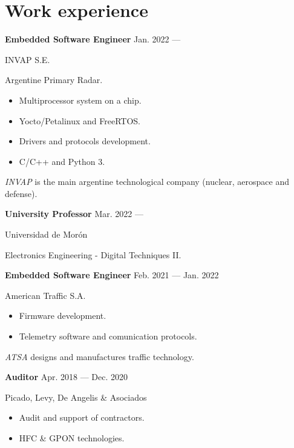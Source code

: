 \section{Work experience}


\parbox[t][][t]{\linewidth}{
	\parbox{\linewidth}{
		\textbf{Embedded Software Engineer}
			\hfill
			{Jan. 2022 --- \phantom{Dec. 2099}}
		}
	\smallbreak
	\parbox{\linewidth}{INVAP S.E.}
	\smallbreak
	Argentine Primary Radar.
	\begin{itemize}
	    \item{Multiprocessor system on a chip.}
		\item{Yocto/Petalinux and FreeRTOS.}
		\item{Drivers and protocols development.}
		\item{C/C++ and Python 3.}
	\end{itemize}
	\smallbreak
    \emph{INVAP} is the main argentine technological company (nuclear, aerospace and defense).
}

\bigskip
\parbox[t][][t]{\linewidth}{
	\parbox{\linewidth}{
		\textbf{University Professor}
			\hfill
			{Mar. 2022 --- \phantom{Dec. 2099}}
		}
	\smallbreak
	\parbox{\linewidth}{Universidad de Morón}
	\smallbreak
	Electronics Engineering - Digital Techniques II.
}

\bigskip
\parbox[t][][t]{\linewidth}{
	\parbox{\linewidth}{
		\textbf{Embedded Software Engineer}
			\hfill
			{Feb. 2021 --- Jan. 2022}
		}
	\smallbreak
	\parbox{\linewidth}{American Traffic S.A.}
	\smallbreak
	\begin{itemize}
	    \item{Firmware development.}
	    \item{Telemetry software and comunication protocols.}
	\end{itemize}
	\smallbreak
    \emph{ATSA} designs and manufactures traffic technology.
}

\bigskip
\parbox[t][][t]{\linewidth}{
	\parbox{\linewidth}{
		\textbf{Auditor}
			\hfill
			{Apr. 2018 --- Dec. 2020}
		}
	\smallbreak
	\parbox{\linewidth}{Picado, Levy, De Angelis \& Asociados}
	\smallbreak
	\begin{itemize}
	    \item{Audit and support of contractors.}
	    \item{HFC \& GPON technologies.}
	\end{itemize}
	\smallbreak
}

